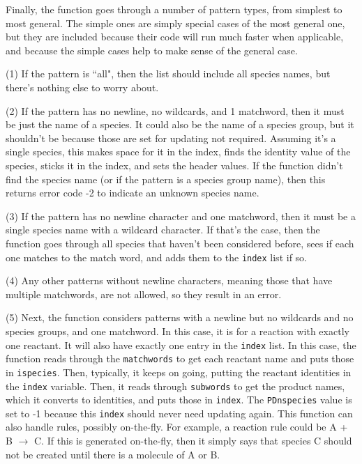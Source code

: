 \documentclass {scrbook}
\newcommand {\ttt} {\texttt}
\begin{document}
\begin{description}
Finally, the function goes through a number of pattern types, from simplest to most general. The simple ones are simply special cases of the most general one, but they are included because their code will run much faster when applicable, and because the simple cases help to make sense of the general case.

(1) If the pattern is ``all", then the list should include all species names, but there's nothing else to worry about.

(2) If the pattern has no newline, no wildcards, and 1 matchword, then it must be just the name of a species. It could also be the name of a species group, but it shouldn't be because those are set for updating not required. Assuming it's a single species, this makes space for it in the index, finds the identity value of the species, sticks it in the index, and sets the header values. If the function didn't find the species name (or if the pattern is a species group name), then this returns error code -2 to indicate an unknown species name.

(3) If the pattern has no newline character and one matchword, then it must be a single species name with a wildcard character. If that's the case, then the function goes through all species that haven't been considered before, sees if each one matches to the match word, and adds them to the \ttt{index} list if so.

(4) Any other patterns without newline characters, meaning those that have multiple matchwords, are not allowed, so they result in an error.

(5) Next, the function considers patterns with a newline but no wildcards and no species groups, and one matchword. In this case, it is for a reaction with exactly one reactant. It will also have exactly one entry in the \ttt{index} list. In this case, the function reads through the \ttt{matchwords} to get each reactant name and puts those in \ttt{ispecies}. Then, typically, it keeps on going, putting the reactant identities in the \ttt{index} variable. Then, it reads through \ttt{subwords} to get the product names, which it converts to identities, and puts those in \ttt{index}. The \ttt{PDnspecies} value is set to -1 because this \ttt{index} should never need updating again. This function can also handle rules, possibly on-the-fly. For example, a reaction rule could be A + B $\rightarrow$ C. If this is generated on-the-fly, then it simply says that species C should not be created until there is a molecule of A or B.


\end{description}
\end{document}

